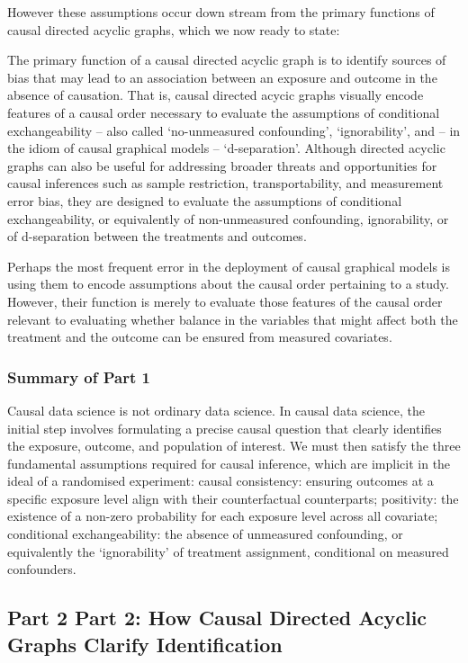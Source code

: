 \documentclass[
  single column]{article}
\begin{document}
However these assumptions occur down stream from the primary functions
of causal directed acyclic graphs, which we now ready to state:

The primary function of a causal directed acyclic graph is to identify
sources of bias that may lead to an association between an exposure and
outcome in the absence of causation. That is, causal directed acycic
graphs visually encode features of a causal order necessary to evaluate
the assumptions of conditional exchangeability -- also called
`no-unmeasured confounding', `ignorability', and -- in the idiom of
causal graphical models -- `d-separation'. Although directed acyclic
graphs can also be useful for addressing broader threats and
opportunities for causal inferences such as sample restriction,
transportability, and measurement error bias, they are designed to
evaluate the assumptions of conditional exchangeability, or equivalently
of non-unmeasured confounding, ignorability, or of d-separation between
the treatments and outcomes.

Perhaps the most frequent error in the deployment of causal graphical
models is using them to encode assumptions about the causal order
pertaining to a study. However, their function is merely to evaluate
those features of the causal order relevant to evaluating whether
balance in the variables that might affect both the treatment and the
outcome can be ensured from measured covariates.

\subsubsection{Summary of Part 1}\label{summary-of-part-1}

Causal data science is not ordinary data science. In causal data
science, the initial step involves formulating a precise causal question
that clearly identifies the exposure, outcome, and population of
interest. We must then satisfy the three fundamental assumptions
required for causal inference, which are implicit in the ideal of a
randomised experiment: causal consistency: ensuring outcomes at a
specific exposure level align with their counterfactual counterparts;
positivity: the existence of a non-zero probability for each exposure
level across all covariate; conditional exchangeability: the absence of
unmeasured confounding, or equivalently the `ignorability' of treatment
assignment, conditional on measured confounders.

\newpage{}

\subsection{Part 2 Part 2: How Causal Directed Acyclic Graphs Clarify
Identification}\label{part-2-part-2-how-causal-directed-acyclic-graphs-clarify-identification}
\end{document}
